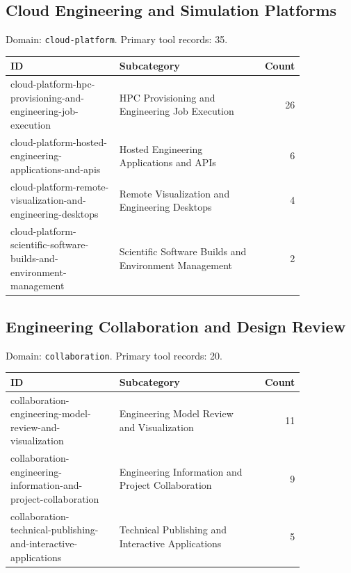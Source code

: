 \subsection{Cloud Engineering and Simulation Platforms}
\noindent Domain: \texttt{cloud-platform}. Primary tool records: 35.
\begin{longtable}{p{0.37\linewidth}p{0.47\linewidth}r}
ID & Subcategory & Count\\\hline\endhead
cloud-platform-hpc-provisioning-and-engineering-job-execution & HPC Provisioning and Engineering Job Execution & 26\\
cloud-platform-hosted-engineering-applications-and-apis & Hosted Engineering Applications and APIs & 6\\
cloud-platform-remote-visualization-and-engineering-desktops & Remote Visualization and Engineering Desktops & 4\\
cloud-platform-scientific-software-builds-and-environment-management & Scientific Software Builds and Environment Management & 2\\
\end{longtable}
\subsection{Engineering Collaboration and Design Review}
\noindent Domain: \texttt{collaboration}. Primary tool records: 20.
\begin{longtable}{p{0.37\linewidth}p{0.47\linewidth}r}
ID & Subcategory & Count\\\hline\endhead
collaboration-engineering-model-review-and-visualization & Engineering Model Review and Visualization & 11\\
collaboration-engineering-information-and-project-collaboration & Engineering Information and Project Collaboration & 9\\
collaboration-technical-publishing-and-interactive-applications & Technical Publishing and Interactive Applications & 5\\
\end{longtable}
